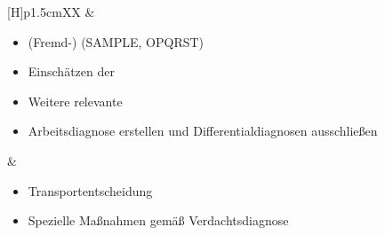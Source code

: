 {\begin{minipage}[t]{\linewidth -
{2\fboxrule} - {2\fboxsep}}
\begin{minipage}[t]{\linewidth}
{\begin{tabularx}{\linewidth}[H]{p{1.5cm}XX}
&
\begin{minipage}[t]{\linewidth}
\begin{itemize}
  \item (Fremd-)  (SAMPLE, OPQRST)
  \item Einschätzen der 
  \item Weitere relevante 
  \item Arbeitsdiagnose erstellen und Differentialdiagnosen
  ausschließen
\end{itemize}
\end{minipage}
&
\noindent\color{Indigo}\begin{minipage}[t]{\linewidth}
\begin{itemize}
  \item Transportentscheidung 
  \item Spezielle Maßnahmen gemäß Verdachtsdiagnose
\end{itemize}
\end{minipage}
\\\addlinespace\bottomrule
\end{tabularx}

\vspace{-0.5\baselineskip}\begin{center}


\end{center}}
\end{minipage}
\end{minipage}}
